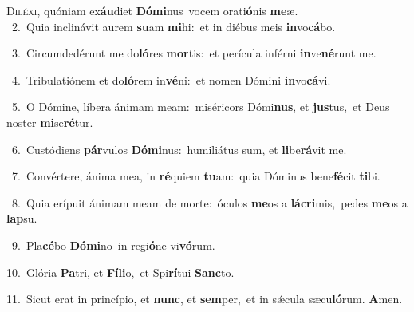\lettrine{\initial\textcolor{\initialcolor}{D}}{iléxi,} quóniam ex\-\textbf{áu}\-diet \textbf{Dó}\-\textbf{mi}nus~\star vocem orati\-\textbf{ó}\-nis \textbf{me}\-æ.\\
{\numbfont\textcolor{\numbcolor}{~2.}}~Quia inclinávit aurem \textbf{su}\-am \textbf{mi}\-hi:~\star et in diébus meis \textbf{in}\-vo\-\textbf{cá}\-bo.\par
{\numbfont\textcolor{\numbcolor}{~3.}}~Circumdedérunt me do\-\textbf{ló}\-res \textbf{mor}\-tis:~\star et perícula inférni \textbf{in}\-ve\-\textbf{né}\-runt me.\par
{\numbfont\textcolor{\numbcolor}{~4.}}~Tribulatiónem et do\-\textbf{ló}\-rem in\-\textbf{vé}\-ni:~\star et nomen Dómini \textbf{in}\-vo\-\textbf{cá}\-vi.\par
{\numbfont\textcolor{\numbcolor}{~5.}}~O Dómine, líbera ánimam meam:~\dagger miséricors Dómi\-\textbf{nus}\-, et \textbf{jus}\-tus,~\star et Deus noster \textbf{mi}\-se\-\textbf{ré}\-tur.\par
{\numbfont\textcolor{\numbcolor}{~6.}}~Custódiens \textbf{pár}\-vulos \textbf{Dó}\-\textbf{mi}nus:~\star humiliátus sum, et \textbf{li}\-be\-\textbf{rá}\-vit me.\par
{\numbfont\textcolor{\numbcolor}{~7.}}~Convértere, ánima mea, in \textbf{ré}\-quiem \textbf{tu}\-am:~\star quia Dóminus bene\-\textbf{fé}\-cit \textbf{ti}\-bi.\par
{\numbfont\textcolor{\numbcolor}{~8.}}~Quia erípuit ánimam meam de morte:~\dagger óculos \textbf{me}\-os a \textbf{lá}\-\textbf{cri}mis,~\star pedes \textbf{me}\-os a \textbf{lap}\-su.\par
{\numbfont\textcolor{\numbcolor}{~9.}}~Pla\-\textbf{cé}\-bo \textbf{Dó}\-\textbf{mi}no~\star in regi\-\textbf{ó}\-ne vi\-\textbf{vó}\-rum.\par
{\numbfont\textcolor{\numbcolor}{10.}}~Glória \textbf{Pa}\-tri, et \textbf{Fí}\-\textbf{li}o,~\star et Spi\-\textbf{rí}\-tui \textbf{Sanc}\-to.\par
{\numbfont\textcolor{\numbcolor}{11.}}~Sicut erat in princípio, et \textbf{nunc}\-, et \textbf{sem}\-per,~\star et in sǽcula sæcu\-\textbf{ló}\-rum. \textbf{A}\-men.\par
